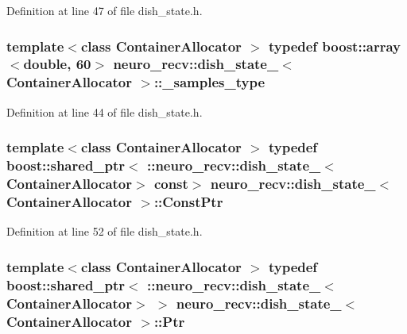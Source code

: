 \-Definition at line 47 of file dish\-\_\-state.\-h.

\subsubsection[{\-\_\-samples\-\_\-type}]{\setlength{\rightskip}{0pt plus 5cm}template$<$class Container\-Allocator $>$ typedef boost\-::array$<$double, 60$>$ {\bf neuro\-\_\-recv\-::dish\-\_\-state\-\_\-}$<$ \-Container\-Allocator $>$\-::{\bf \-\_\-samples\-\_\-type}}\label{structneuro__recv_1_1dish__state___a28439f4d481458e5847c89a76c46465f}


\-Definition at line 44 of file dish\-\_\-state.\-h.

\subsubsection[{\-Const\-Ptr}]{\setlength{\rightskip}{0pt plus 5cm}template$<$class Container\-Allocator $>$ typedef boost\-::shared\-\_\-ptr$<$ \-::{\bf neuro\-\_\-recv\-::dish\-\_\-state\-\_\-}$<$\-Container\-Allocator$>$ const$>$ {\bf neuro\-\_\-recv\-::dish\-\_\-state\-\_\-}$<$ \-Container\-Allocator $>$\-::{\bf \-Const\-Ptr}}\label{structneuro__recv_1_1dish__state___a67a30921268af5c19aad11c014993563}


\-Definition at line 52 of file dish\-\_\-state.\-h.

\subsubsection[{\-Ptr}]{\setlength{\rightskip}{0pt plus 5cm}template$<$class Container\-Allocator $>$ typedef boost\-::shared\-\_\-ptr$<$ \-::{\bf neuro\-\_\-recv\-::dish\-\_\-state\-\_\-}$<$\-Container\-Allocator$>$ $>$ {\bf neuro\-\_\-recv\-::dish\-\_\-state\-\_\-}$<$ \-Container\-Allocator $>$\-::{\bf \-Ptr}}\label{structneuro__recv_1_1dish__state___a0ba6a25015e08fde0bae038b09a42aea}


